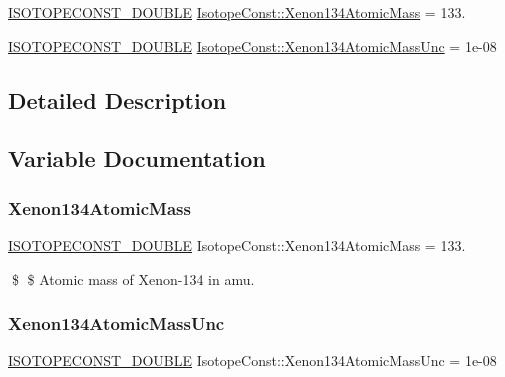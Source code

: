 \begin{DoxyCompactItemize}
\item 
\mbox{\hyperlink{group___isotope_const-_macros_ga8f45a7272ce02c0b4c65c44636ed719a}{I\+S\+O\+T\+O\+P\+E\+C\+O\+N\+S\+T\+\_\+\+D\+O\+U\+B\+LE}} \mbox{\hyperlink{group___isotope_const-_xenon-_xe134_ga6844110f1aecdd4ad2dd5f27e1de9201}{Isotope\+Const\+::\+Xenon134\+Atomic\+Mass}} = 133.
\item 
\mbox{\hyperlink{group___isotope_const-_macros_ga8f45a7272ce02c0b4c65c44636ed719a}{I\+S\+O\+T\+O\+P\+E\+C\+O\+N\+S\+T\+\_\+\+D\+O\+U\+B\+LE}} \mbox{\hyperlink{group___isotope_const-_xenon-_xe134_ga44a5707dc5333c728dfdb2812d0a4b90}{Isotope\+Const\+::\+Xenon134\+Atomic\+Mass\+Unc}} = 1e-\/08
\end{DoxyCompactItemize}


\subsection{Detailed Description}


\subsection{Variable Documentation}
\mbox{\label{group___isotope_const-_xenon-_xe134_ga6844110f1aecdd4ad2dd5f27e1de9201}} 
\subsubsection{\texorpdfstring{Xenon134\+Atomic\+Mass}{Xenon134AtomicMass}}
{\footnotesize\ttfamily \mbox{\hyperlink{group___isotope_const-_macros_ga8f45a7272ce02c0b4c65c44636ed719a}{I\+S\+O\+T\+O\+P\+E\+C\+O\+N\+S\+T\+\_\+\+D\+O\+U\+B\+LE}} Isotope\+Const\+::\+Xenon134\+Atomic\+Mass = 133.}

\$ \$ Atomic mass of Xenon-\/134 in amu. \mbox{\label{group___isotope_const-_xenon-_xe134_ga44a5707dc5333c728dfdb2812d0a4b90}} 
\subsubsection{\texorpdfstring{Xenon134\+Atomic\+Mass\+Unc}{Xenon134AtomicMassUnc}}
{\footnotesize\ttfamily \mbox{\hyperlink{group___isotope_const-_macros_ga8f45a7272ce02c0b4c65c44636ed719a}{I\+S\+O\+T\+O\+P\+E\+C\+O\+N\+S\+T\+\_\+\+D\+O\+U\+B\+LE}} Isotope\+Const\+::\+Xenon134\+Atomic\+Mass\+Unc = 1e-\/08}

